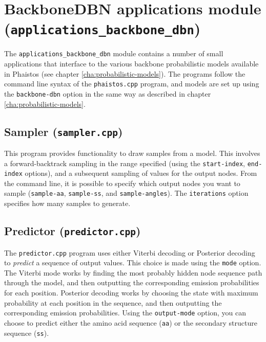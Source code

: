 \chapter[BackboneDBN applications module]{BackboneDBN applications module\\(\texttt{applications\_backbone\_dbn})}
\label{cha:backbone-dbn-apps}

The \texttt{applications\_backbone\_dbn} module contains a number of
small applications that interface to the various backbone
probabilistic models available in Phaistos (see chapter
\ref{cha:probabilistic-models}). The programs follow the command line
syntax of the \texttt{phaistos.cpp} program, and models are set up
using the \texttt{backbone-dbn} option in the same way as described in chapter
\ref{cha:probabilistic-models}.

\section{Sampler (\texttt{sampler.cpp})}
\label{sec:sampler}

This program provides functionality to draw samples from a model. This
involves a forward-backtrack sampling in the range specified (using
the \texttt{start-index}, \texttt{end-index} options), and a
subsequent sampling of values for the output nodes. From the command
line, it is possible to specify which output nodes you want to sample
(\texttt{sample-aa}, \texttt{sample-ss}, and
\texttt{sample-angles}). The \texttt{iterations} option specifies how
many samples to generate.


\section{Predictor (\texttt{predictor.cpp})}
\label{sec:predictor}

The \texttt{predictor.cpp} program uses either Viterbi decoding or
Posterior decoding to \emph{predict} a sequence of output values. This
choice is made using the \texttt{mode} option. The Viterbi mode works
by finding the most probably hidden node sequence path through the
model, and then outputting the corresponding emission probabilities
for each position. Posterior decoding works by choosing the state with
maximum probability at each position in the sequence, and then
outputting the corresponding emission probabilities. Using the
\texttt{output-mode} option, you can choose to predict either the
amino acid sequence (\texttt{aa}) or the secondary structure sequence
(\texttt{ss}).


